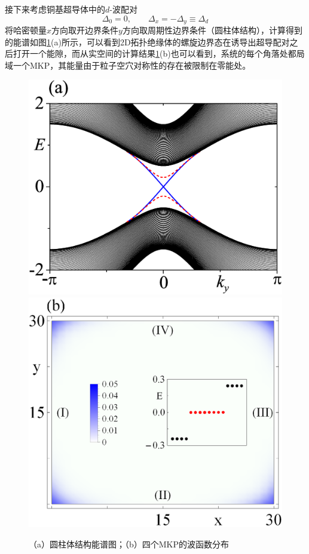  接下来考虑铜基超导体中的$d$-波配对
\begin{equation}
\Delta_0=0,\qquad\Delta_x=-\Delta_y\equiv\Delta_d
\end{equation}
将哈密顿量$x$方向取开边界条件$y$方向取周期性边界条件（圆柱体结构），计算得到的能谱如图\ref{fig9}(a)所示，可以看到2D拓扑绝缘体的螺旋边界态在诱导出超导配对之后打开一个能隙，而从实空间的计算结果\ref{fig9}(b)也可以看到，系统的每个角落处都局域一个MKP，其能量由于粒子空穴对称性的存在被限制在零能处。
\begin{figure}[h]
\centering
\includegraphics[scale=0.26]{pic/fig9}
\includegraphics[scale=0.5]{pic/fig10}
\caption{（a）圆柱体结构能谱图；（b）四个MKP的波函数分布}\label{fig9}
\end{figure}
